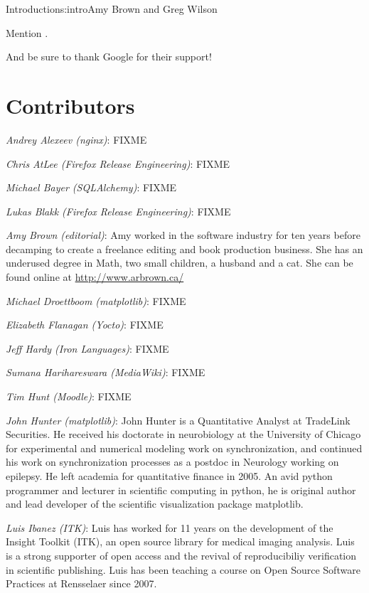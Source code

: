 \begin{aosachapter}{Introduction}{s:intro}{Amy Brown and Greg Wilson}

Mention \cite{bib:aosa1}.

And be sure to thank Google for their support!

\section*{Contributors}

\emph{Andrey Alexeev (nginx)}: FIXME

\emph{Chris AtLee (Firefox Release Engineering)}: FIXME

\emph{Michael Bayer (SQLAlchemy)}: FIXME

\emph{Lukas Blakk (Firefox Release Engineering)}: FIXME

\emph{Amy Brown (editorial)}: Amy worked in the software industry for
ten years before decamping to create a freelance editing and book production
business. She has an underused degree in Math, two small children, a
husband and a cat. She can be found online at \url{http://www.arbrown.ca/}

\emph{Michael Droettboom (matplotlib)}: FIXME

\emph{Elizabeth Flanagan (Yocto)}: FIXME

\emph{Jeff Hardy (Iron Languages)}: FIXME

\emph{Sumana Harihareswara (MediaWiki)}: FIXME

\emph{Tim Hunt (Moodle)}: FIXME

\emph{John Hunter (matplotlib)}: John Hunter is a Quantitative Analyst
at TradeLink Securities.  He received his doctorate in neurobiology at
the University of Chicago for experimental and numerical modeling work
on synchronization, and continued his work on synchronization
processes as a postdoc in Neurology working on epilepsy. He left
academia for quantitative finance in 2005.  An avid python programmer
and lecturer in scientific computing in python, he is original author
and lead developer of the scientific visualization package matplotlib.

\emph{Luis Ibanez (ITK)}: Luis has worked for 11 years on the development of
the Insight Toolkit (ITK), an open source library for medical imaging analysis.
Luis is a strong supporter of open access and the revival of reproducibiliy
verification in scientific publishing. Luis has been teaching a course on Open
Source Software Practices at Rensselaer since 2007.


\end{aosachapter}
